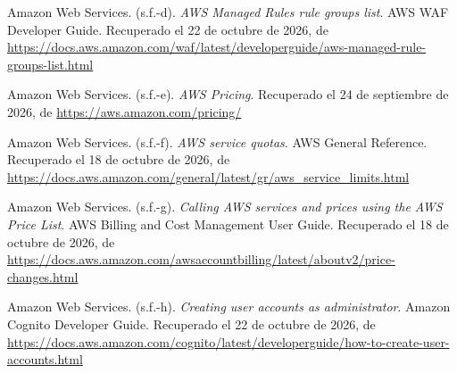 \documentclass[12pt, a4paper]{article}
\begin{document}
\begin{list}{}{\setlength{\leftmargin}{1.27cm}\setlength{\itemindent}{-1.27cm}%
  \setlength{\labelwidth}{0pt}\setlength{\labelsep}{0pt}\setlength{\itemsep}{6pt}}
 
\item Amazon Web Services. (s.f.-d). \textit{AWS Managed Rules rule
  groups list}. AWS WAF Developer Guide. Recuperado el 22 de octubre de 2026, de \url{https://docs.aws.amazon.com/waf/latest/developerguide/aws-managed-rule-groups-list.html}
 
 
\item Amazon Web Services. (s.f.-e). \textit{AWS Pricing}. Recuperado el
  24 de septiembre de 2026, de \url{https://aws.amazon.com/pricing/}
 
 
\item Amazon Web Services. (s.f.-f). \textit{AWS service quotas}. AWS General Reference. Recuperado el 18 de octubre de 2026, de \url{https://docs.aws.amazon.com/general/latest/gr/aws_service_limits.html}
 
 
\item Amazon Web Services. (s.f.-g). \textit{Calling AWS services and
  prices using the AWS Price List}. AWS Billing and Cost Management
  User Guide. Recuperado el 18 de octubre de 2026, de \url{https://docs.aws.amazon.com/awsaccountbilling/latest/aboutv2/price-changes.html}
 

\item Amazon Web Services. (s.f.-h). \textit{Creating user accounts as
  administrator}. Amazon Cognito Developer Guide. Recuperado el 22 de octubre de 2026, de \url{https://docs.aws.amazon.com/cognito/latest/developerguide/how-to-create-user-accounts.html}
 
 

\end{list}
\end{document}
